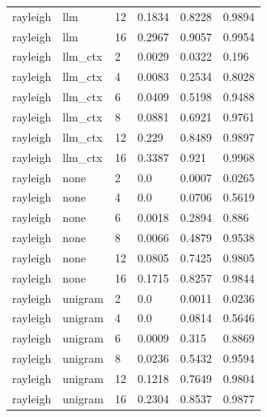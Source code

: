 \begin{tabular}{llllll}
rayleigh & llm & 12 & 0.1834 & 0.8228 & 0.9894 \\
rayleigh & llm & 16 & 0.2967 & 0.9057 & 0.9954 \\
rayleigh & llm\_ctx & 2 & 0.0029 & 0.0322 & 0.196 \\
rayleigh & llm\_ctx & 4 & 0.0083 & 0.2534 & 0.8028 \\
rayleigh & llm\_ctx & 6 & 0.0409 & 0.5198 & 0.9488 \\
rayleigh & llm\_ctx & 8 & 0.0881 & 0.6921 & 0.9761 \\
rayleigh & llm\_ctx & 12 & 0.229 & 0.8489 & 0.9897 \\
rayleigh & llm\_ctx & 16 & 0.3387 & 0.921 & 0.9968 \\
rayleigh & none & 2 & 0.0 & 0.0007 & 0.0265 \\
rayleigh & none & 4 & 0.0 & 0.0706 & 0.5619 \\
rayleigh & none & 6 & 0.0018 & 0.2894 & 0.886 \\
rayleigh & none & 8 & 0.0066 & 0.4879 & 0.9538 \\
rayleigh & none & 12 & 0.0805 & 0.7425 & 0.9805 \\
rayleigh & none & 16 & 0.1715 & 0.8257 & 0.9844 \\
rayleigh & unigram & 2 & 0.0 & 0.0011 & 0.0236 \\
rayleigh & unigram & 4 & 0.0 & 0.0814 & 0.5646 \\
rayleigh & unigram & 6 & 0.0009 & 0.315 & 0.8869 \\
rayleigh & unigram & 8 & 0.0236 & 0.5432 & 0.9594 \\
rayleigh & unigram & 12 & 0.1218 & 0.7649 & 0.9804 \\
rayleigh & unigram & 16 & 0.2304 & 0.8537 & 0.9877 \\
\hline
\end{tabular}
